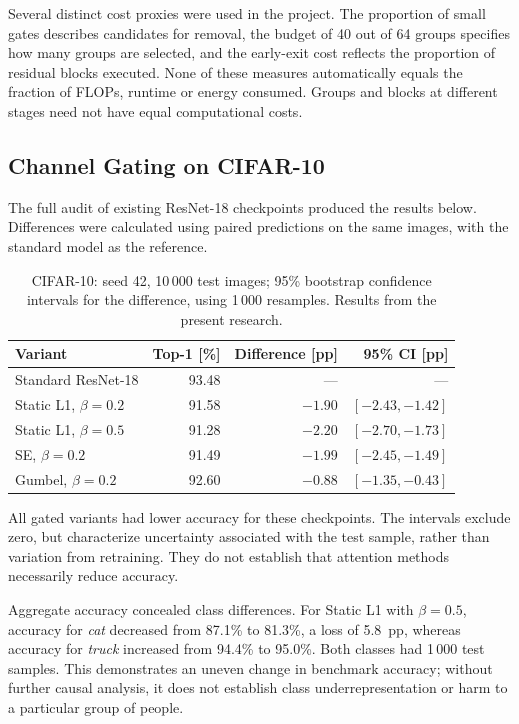 \documentclass[12pt,a4paper]{article}
\newcommand{\pp}{pp}
\begin{document}
Several distinct cost proxies were used in the project.
The proportion of small gates describes candidates for removal,
the budget of 40 out of 64 groups specifies how many groups are selected,
and the early-exit cost reflects the proportion of residual blocks executed.
None of these measures automatically equals the fraction of FLOPs,
runtime or energy consumed. Groups and blocks at different stages
need not have equal computational costs.

\subsection{Channel Gating on CIFAR-10}

The full audit of existing ResNet-18 checkpoints produced the results
below. Differences were calculated using paired predictions on the same
images, with the standard model as the reference.

\begin{table}[htbp]
\centering\small
\caption{CIFAR-10: seed 42, 10\,000 test images; 95\% bootstrap confidence
intervals for the difference, using 1\,000 resamples. Results from the present research.}
\begin{tabularx}{\textwidth}{@{}Yrrr@{}}
\toprule
Variant & Top-1 [\%] & Difference [\pp] & 95\% CI [\pp] \\
\midrule
Standard ResNet-18 & 93.48 & --- & --- \\
Static L1, $\beta=0.2$ & 91.58 & $-1.90$ & $[-2.43,-1.42]$ \\
Static L1, $\beta=0.5$ & 91.28 & $-2.20$ & $[-2.70,-1.73]$ \\
SE, $\beta=0.2$ & 91.49 & $-1.99$ & $[-2.45,-1.49]$ \\
Gumbel, $\beta=0.2$ & 92.60 & $-0.88$ & $[-1.35,-0.43]$ \\
\bottomrule
\end{tabularx}
\end{table}

All gated variants had lower accuracy for these checkpoints.
The intervals exclude zero, but characterize uncertainty associated
with the test sample, rather than variation from retraining.
They do not establish that attention methods necessarily reduce accuracy.

Aggregate accuracy concealed class differences. For Static L1 with
$\beta=0.5$, accuracy for \emph{cat} decreased from 87.1\% to 81.3\%,
a loss of 5.8~\pp, whereas accuracy for \emph{truck} increased from
94.4\% to 95.0\%. Both classes had 1\,000 test samples.
This demonstrates an uneven change in benchmark accuracy; without further
causal analysis, it does not establish class underrepresentation or
harm to a particular group of people.
\end{document}
